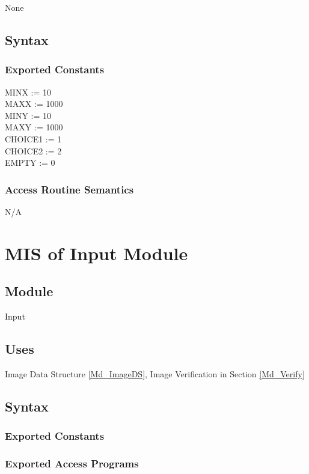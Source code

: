 \documentclass[12pt, titlepage]{article}
\begin{document}
None

\subsection{Syntax}

\subsubsection{Exported Constants}

MINX := 10\\
MAXX := 1000\\
MINY := 10\\
MAXY := 1000\\
CHOICE1 := 1\\
CHOICE2 := 2\\
EMPTY := 0


\subsubsection{Access Routine Semantics}
N/A

\newpage

\section{MIS of Input Module} \label{Md_Input}
\subsection{Module}

Input

\subsection{Uses}

Image Data Structure \ref{Md_ImageDS}, Image Verification in Section
\ref{Md_Verify}

\subsection{Syntax}

\subsubsection{Exported Constants}

\subsubsection{Exported Access Programs}
\end{document}
